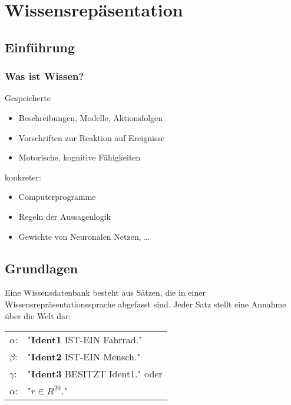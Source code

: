 
\section{Wissensrepäsentation}

\subsection{Einführung}

\subsubsection*{Was ist Wissen?}
Gespeicherte
\begin{itemize}
\item Beschreibungen, Modelle, Aktionsfolgen
\item Vorschriften zur Reaktion auf Ereignisse
\item Motorische, kognitive Fähigkeiten
\end{itemize}
konkreter:
\begin{itemize}
\item Computerprogramme
\item Regeln der Aussagenlogik
\item Gewichte von Neuronalen Netzen, \dots
\end{itemize}

\subsection{Grundlagen}


Eine Wissensdatenbank besteht aus Sätzen, die in einer Wissensrepräsentationssprache abgefasst sind. Jeder Satz stellt eine Annahme über die Welt dar:
\begin{center}
\begin{tabular}{ll}
$\alpha$: & "{}\textbf{Ident1} IST-EIN Fahrrad."{} \\ $\beta$: & "{}\textbf{Ident2} IST-EIN Mensch."{} \\ $\gamma$: & "{}\textbf{Ident3} BESITZT Ident1."{} oder \\ $\alpha$: & "{}$r \in R^{20}$."{}
\end{tabular}
\end{center}


